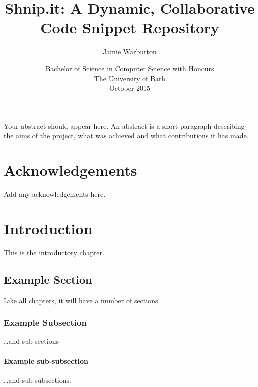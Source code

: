 \documentclass[11pt,openright,a4paper]{report}
\title{Shnip.it: A Dynamic, Collaborative Code Snippet Repository}
\author{Jamie Warburton}
\date{Bachelor of Science in Computer Science with Honours\\The University of Bath\\October 2015}
\begin{document}
\lstset{language=Java,breaklines,breakatwhitespace,basicstyle=\small}


\setcounter{page}{0}


\maketitle
\newpage


\newpage


\newpage


\abstract
Your abstract should appear here.  An abstract is a short
paragraph describing the aims of the project, what was
achieved and what contributions it has made.
\newpage


\tableofcontents
\newpage
\listoffigures
\newpage
\listoftables
\newpage


\chapter*{Acknowledgements}
Add any acknowledgements here.
\newpage


\setcounter{page}{1}



\chapter{Introduction}
%

This is the introductory chapter.

\section{Example Section}
Like all chapters, it will have a number of sections

\subsection{Example Subsection}
\ldots and sub-sections

\subsubsection{Example sub-subsection}
\ldots and sub-subsections.
\end{document}
